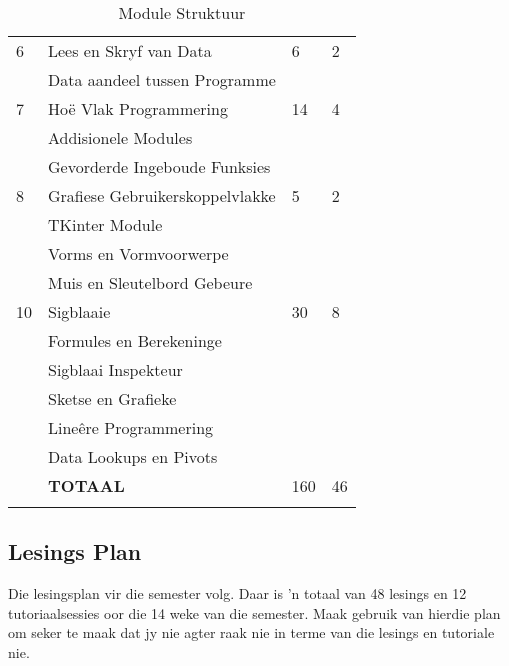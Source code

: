 \begin{longtable}{|p{2.0cm}|p{7.6cm}|p{2.0cm}|p{1.8cm}|}
             \hline
             6  & Lees en Skryf van Data                       &  6 & 2  \\
                & \qquad Data aandeel tussen Programme         &    &    \\
             \hline
             7  & Ho\"{e} Vlak Programmering                   & 14 & 4  \\
                & \qquad Addisionele Modules                   &    &    \\
                & \qquad Gevorderde Ingeboude Funksies         &    &    \\
             \hline
             8  & Grafiese Gebruikerskoppelvlakke              &  5 & 2  \\
                & \qquad TKinter Module                        &    &    \\
                & \qquad Vorms en Vormvoorwerpe                &    &    \\
                & \qquad Muis en Sleutelbord Gebeure           &    &    \\
             \hline
             10 & Sigblaaie                                    & 30 & 8  \\
                & \qquad Formules en Berekeninge               &    &    \\
                & \qquad Sigblaai Inspekteur                   &    &    \\
                & \qquad Sketse en Grafieke                    &    &    \\
                & \qquad Line\^{e}re Programmering             &    &    \\
                & \qquad Data Lookups en Pivots                &    &    \\
             \hline
                & {\bf TOTAAL}                                 &160 & 46 \\
             \hline
            \caption[Module Struktuur]{Module Struktuur} \label{tab:study_comp}
        \end{longtable}

    \subsection{Lesings Plan}
        Die lesingsplan vir die semester volg. Daar is 'n totaal van 48
        lesings en 12 tutoriaalsessies oor die 14 weke van die semester. Maak
        gebruik van hierdie plan om seker te maak dat jy nie agter raak nie in
        terme van die lesings en tutoriale nie.

